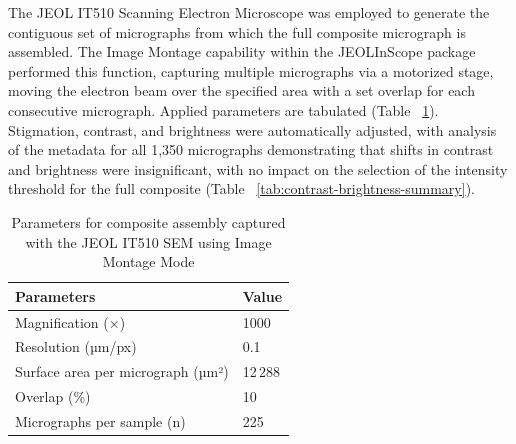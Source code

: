 \documentclass[review]{elsarticle}
\begin{document}
The JEOL IT510 Scanning Electron Microscope was employed to generate the
contiguous set of micrographs from which the full composite micrograph is
assembled. The Image Montage capability within the JEOLInScope package performed
this function, capturing multiple micrographs via a motorized stage, moving the
electron beam over the specified area with a set overlap for each consecutive
micrograph. Applied parameters are tabulated (Table
~\ref{tab:microscopy_parameters}). Stigmation, contrast, and brightness were
automatically adjusted, with analysis of the metadata for all 1,350 micrographs
demonstrating that shifts in contrast and brightness were insignificant, with no
impact on the selection of the intensity threshold for the full composite (Table
~\ref{tab:contrast-brightness-summary}). 

\begin{table}
  \centering
  \caption{Summary of the contrast and brightness applied by the automatic adjustment of the SEM software package for all micrographs, expressed as percentages of respective maxima for each sample.}
  \label{tab:contrast-brightness-summary}
\end{table}

\begin{table}
  \centering
  \caption{Parameters for composite assembly captured with the JEOL IT510 SEM using Image Montage Mode}
  \label{tab:microscopy_parameters}
  \begin{tabular}{l l}
    \hline
    Parameters & Value \\
    \hline
    Magnification ($\times$)                    & 1000 \\
    Resolution (µm/px)               & 0.1 \\
    Surface area per micrograph (µm²) & 12\,288 \\
    Overlap (\%)                          & 10 \\
    Micrographs per sample (n)            & 225 \\
    \hline
  \end{tabular}%
\end{table}
\end{document}

